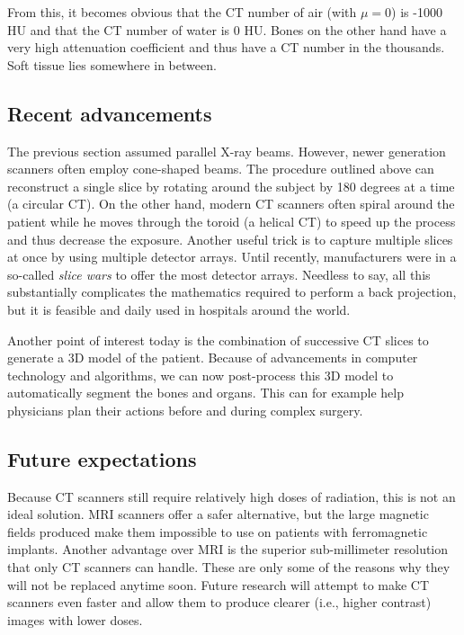 From this, it becomes obvious that the CT number of air (with $\mu = 0$) is
-1000 HU and that the CT number of water is 0 HU. Bones on the other hand have a
very high attenuation coefficient and thus have a CT number in the thousands.
Soft tissue lies somewhere in between.

\subsection{Recent advancements}
The previous section assumed parallel X-ray beams. However, newer generation
scanners often employ cone-shaped beams. The procedure outlined above can
reconstruct a single slice by rotating around the subject by 180 degrees at a
time (a circular CT). On the other hand, modern CT scanners often spiral around
the patient while he moves through the toroid (a helical CT) to speed up the
process and thus decrease the exposure. Another useful trick is to capture
multiple slices at once by using multiple detector arrays. Until recently,
manufacturers were in a so-called \emph{slice wars} to offer the most detector
arrays. Needless to say, all this substantially complicates the mathematics
required to perform a back projection, but it is feasible and daily used in
hospitals around the world.

Another point of interest today is the combination of successive CT slices to
generate a 3D model of the patient. Because of advancements in computer
technology and algorithms, we can now post-process this 3D model to
automatically segment the bones and organs. This can for example help physicians
plan their actions before and during complex surgery.

\subsection{Future expectations}
Because CT scanners still require relatively high doses of radiation, this is
not an ideal solution. MRI scanners offer a safer alternative, but the large
magnetic fields produced make them impossible to use on patients with ferromagnetic
implants. Another advantage over MRI is the superior sub-millimeter resolution
that only CT scanners can handle. These are only some of the reasons why they
will not be replaced anytime soon. Future research will attempt to make CT scanners
even faster and allow them to produce clearer (i.e., higher contrast) images
with lower doses.